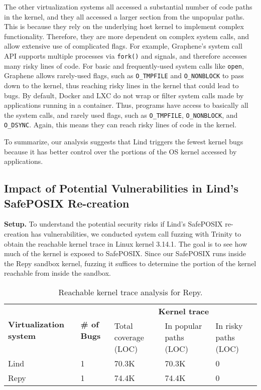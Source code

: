 {{{The other virtualization systems all accessed a substantial number of code
paths in the kernel, and they all accessed a larger section from the unpopular
paths. This is because they rely on the underlying host kernel to implement
complex functionality. Therefore, they are more dependent on complex system
calls, and allow extensive use of complicated flags. For example, Graphene's
system call API supports multiple processes via \texttt{fork()} and signals,
and therefore accesses many risky lines of code.
For basic and frequently-used system calls like \texttt{open},
Graphene allows rarely-used flags, such as \texttt{O\_TMPFILE} and \texttt{O\_NONBLOCK}
to pass down to the kernel, thus reaching risky lines in the kernel that could lead to bugs.
By default, Docker and LXC do not wrap or filter system calls made by applications
running in a container. Thus, programs have access to basically all the system
calls, and rarely used flags, such as \texttt{O\_TMPFILE},
\texttt{O\_NONBLOCK}, and \texttt{O\_DSYNC}. Again, this means they can reach
risky lines of code in the kernel.

To summarize, our analysis suggests that Lind triggers the fewest kernel bugs because
it has better control over the portions of the OS kernel accessed by applications.

\subsection{Impact of Potential Vulnerabilities in Lind's SafePOSIX Re-creation}
\label{Reachable-Kernel-Trace-Analysis-for-Repy-Sandbox}


\noindent
\textbf{Setup.}
To understand the potential security risks if Lind's SafePOSIX re-creation
has vulnerabilities, we conducted system call fuzzing with Trinity
to obtain the reachable kernel trace in Linux kernel 3.14.1.
The goal is to see how much of the kernel is exposed to
SafePOSIX. Since our SafePOSIX runs inside the Repy sandbox kernel,
fuzzing it suffices to determine the portion of the kernel reachable from
inside the sandbox.

\begin{table}
\centering
\scriptsize
\begin{tabular}{|l|l|l|l|l|}
  \hline
  \multirow{3}{1.5cm}{\bf Virtualization system} & \multirow{3}{0.5cm}{\bf \# of Bugs} & \multicolumn{3}{c|}{\bf Kernel trace} \\ \cline{3-5}
  & & \multirow{2}{1.5cm}{Total coverage (LOC)} & \multirow{2}{1.3cm}{In popular paths (LOC)} & \multirow{2}{1.3cm}{In risky paths (LOC)}  \\
  & & & & \\  \hline
  Lind & 1 & 70.3K & 70.3K & 0 \\
  \hline
  Repy & 1 & 74.4K & 74.4K & 0 \\
  \hline
\end{tabular}\caption{\small Reachable kernel trace analysis for Repy.}
\label{table:trace-Repy}
\end{table}

}}}
